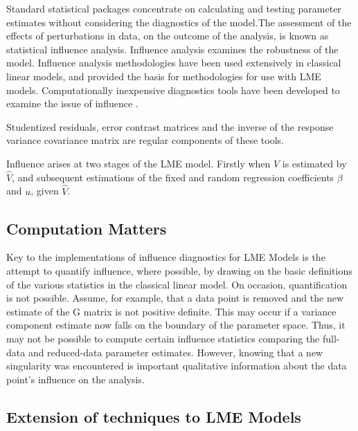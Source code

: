 \documentclass[12pt, a4paper]{report}
\theoremstyle{plain}
\theoremstyle{definition}
\theoremstyle{remark}
\begin{document}
Standard statistical packages concentrate on calculating and testing parameter estimates without considering the diagnostics of the model.The assessment of the effects of perturbations in data, on the outcome of the analysis, is known as statistical influence analysis. Influence analysis examines the robustness of the model. Influence analysis methodologies have been used extensively in classical linear models, and provided the basis for methodologies for use with LME models.
Computationally inexpensive diagnostics tools have been developed to examine the issue of influence \citep{Zewotir}.

Studentized residuals, error contrast matrices and the inverse of the response variance covariance matrix are regular components of these tools.

Influence arises at two stages of the LME model. Firstly when $V$ is estimated by $\hat{V}$, and subsequent
estimations of the fixed and random regression coefficients $\beta$ and $u$, given $\hat{V}$.




\subsection{Computation Matters}
Key to the implementations of influence diagnostics for LME Models is the attempt to quantify influence, where possible, by drawing on the basic definitions of the various statistics in the classical linear	model. 
On occasion, quantification is not possible. Assume, for example, that a data point is removed
and the new estimate of the G matrix is not positive definite. This may occur if a variance component estimate now falls on the boundary of the parameter space. Thus, it may not be possible to compute certain influence statistics comparing the full-data and reduced-data parameter estimates. However, knowing that a new singularity was encountered is important qualitative information about the data point’s influence on	the analysis.

\subsection{Extension of techniques to LME Models} %
\end{document}
